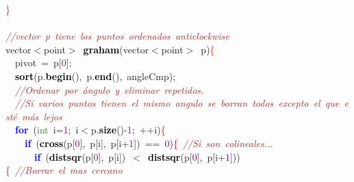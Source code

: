 {{\mbox{}\textcolor{Red}{\}} \\
\mbox{} \\
\mbox{}\textit{\textcolor{Brown}{//vector\ p\ tiene\ los\ puntos\ ordenados\ anticlockwise}} \\
\mbox{}vector\textcolor{BrickRed}{$<$}point\textcolor{BrickRed}{$>$}\ \textbf{\textcolor{Black}{graham}}\textcolor{BrickRed}{(}vector\textcolor{BrickRed}{$<$}point\textcolor{BrickRed}{$>$}\ p\textcolor{BrickRed}{)}\textcolor{Red}{\{} \\
\mbox{}\ \ pivot\ \textcolor{BrickRed}{=}\ p\textcolor{BrickRed}{[}\textcolor{Purple}{0}\textcolor{BrickRed}{];} \\
\mbox{}\ \ \textbf{\textcolor{Black}{sort}}\textcolor{BrickRed}{(}p\textcolor{BrickRed}{.}\textbf{\textcolor{Black}{begin}}\textcolor{BrickRed}{(),}\ p\textcolor{BrickRed}{.}\textbf{\textcolor{Black}{end}}\textcolor{BrickRed}{(),}\ angleCmp\textcolor{BrickRed}{);} \\
\mbox{}\ \ \textit{\textcolor{Brown}{//Ordenar\ por\ ángulo\ y\ eliminar\ repetidos.}} \\
\mbox{}\ \ \textit{\textcolor{Brown}{//Si\ varios\ puntos\ tienen\ el\ mismo\ angulo\ se\ borran\ todos\ excepto\ el\ que\ esté\ más\ lejos}} \\
\mbox{}\ \ \textbf{\textcolor{Blue}{for}}\ \textcolor{BrickRed}{(}\textcolor{ForestGreen}{int}\ i\textcolor{BrickRed}{=}\textcolor{Purple}{1}\textcolor{BrickRed}{;}\ i\textcolor{BrickRed}{$<$}p\textcolor{BrickRed}{.}\textbf{\textcolor{Black}{size}}\textcolor{BrickRed}{()-}\textcolor{Purple}{1}\textcolor{BrickRed}{;}\ \textcolor{BrickRed}{++}i\textcolor{BrickRed}{)}\textcolor{Red}{\{}\ \ \ \  \\
\mbox{}\ \ \ \ \textbf{\textcolor{Blue}{if}}\ \textcolor{BrickRed}{(}\textbf{\textcolor{Black}{cross}}\textcolor{BrickRed}{(}p\textcolor{BrickRed}{[}\textcolor{Purple}{0}\textcolor{BrickRed}{],}\ p\textcolor{BrickRed}{[}i\textcolor{BrickRed}{],}\ p\textcolor{BrickRed}{[}i\textcolor{BrickRed}{+}\textcolor{Purple}{1}\textcolor{BrickRed}{])}\ \textcolor{BrickRed}{==}\ \textcolor{Purple}{0}\textcolor{BrickRed}{)}\textcolor{Red}{\{}\ \textit{\textcolor{Brown}{//Si\ son\ colineales...}} \\
\mbox{}\ \ \ \ \ \ \textbf{\textcolor{Blue}{if}}\ \textcolor{BrickRed}{(}\textbf{\textcolor{Black}{distsqr}}\textcolor{BrickRed}{(}p\textcolor{BrickRed}{[}\textcolor{Purple}{0}\textcolor{BrickRed}{],}\ p\textcolor{BrickRed}{[}i\textcolor{BrickRed}{])}\ \textcolor{BrickRed}{$<$}\ \textbf{\textcolor{Black}{distsqr}}\textcolor{BrickRed}{(}p\textcolor{BrickRed}{[}\textcolor{Purple}{0}\textcolor{BrickRed}{],}\ p\textcolor{BrickRed}{[}i\textcolor{BrickRed}{+}\textcolor{Purple}{1}\textcolor{BrickRed}{]))}\textcolor{Red}{\{}\ \textit{\textcolor{Brown}{//Borrar\ el\ mas\ cercano}} \\
}}
